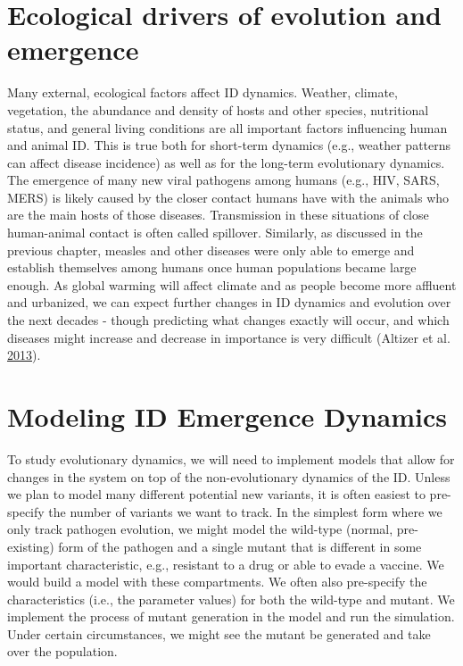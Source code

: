 \documentclass[]{book}
\theoremstyle{definition}
\theoremstyle{definition}
\theoremstyle{definition}
\theoremstyle{remark}
\begin{document}
\section{Ecological drivers of evolution and
emergence}\label{ecological-drivers-of-evolution-and-emergence}

Many external, ecological factors affect ID dynamics. Weather, climate,
vegetation, the abundance and density of hosts and other species,
nutritional status, and general living conditions are all important
factors influencing human and animal ID. This is true both for
short-term dynamics (e.g., weather patterns can affect disease
incidence) as well as for the long-term evolutionary dynamics. The
emergence of many new viral pathogens among humans (e.g., HIV, SARS,
MERS) is likely caused by the closer contact humans have with the
animals who are the main hosts of those diseases. Transmission in these
situations of close human-animal contact is often called spillover.
Similarly, as discussed in the previous chapter, measles and other
diseases were only able to emerge and establish themselves among humans
once human populations became large enough. As global warming will
affect climate and as people become more affluent and urbanized, we can
expect further changes in ID dynamics and evolution over the next
decades - though predicting what changes exactly will occur, and which
diseases might increase and decrease in importance is very difficult
(Altizer et al. \protect\hyperlink{ref-altizer13}{2013}).

\section{Modeling ID Emergence
Dynamics}\label{modeling-id-emergence-dynamics}

To study evolutionary dynamics, we will need to implement models that
allow for changes in the system on top of the non-evolutionary dynamics
of the ID. Unless we plan to model many different potential new
variants, it is often easiest to pre-specify the number of variants we
want to track. In the simplest form where we only track pathogen
evolution, we might model the wild-type (normal, pre-existing) form of
the pathogen and a single mutant that is different in some important
characteristic, e.g., resistant to a drug or able to evade a vaccine. We
would build a model with these compartments. We often also pre-specify
the characteristics (i.e., the parameter values) for both the wild-type
and mutant. We implement the process of mutant generation in the model
and run the simulation. Under certain circumstances, we might see the
mutant be generated and take over the population.
\end{document}
